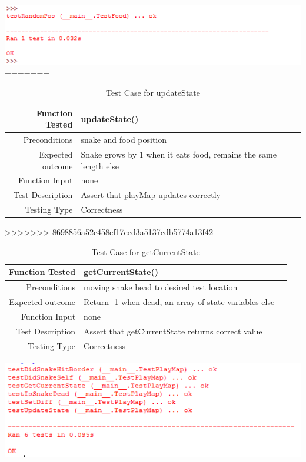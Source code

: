 \documentclass[12pt]{article}
\begin{document}
\includegraphics{testFoodResults}\newline\newline
=======
\begin{center}
	\begin{longtable}{ | r | p{4cm} | p{4cm} }
	\caption{Test Case for updateState} \\ \hline \label{TblInputVar} 
	Function Tested & updateState()\\ \hline
	Preconditions & snake and food position \\ \hline
	Expected outcome & Snake grows by 1 when it eats food, remains the same length else \\ \hline
	Function Input & none \\ \hline
	Test Description & Assert that playMap updates correctly \\ \hline
	Testing Type & Correctness\\ \hline
	
	\end{longtable}
\end{center}
>>>>>>> 8698856a52c458cf17ced3a5137cdb5774a13f42

\begin{center}
	\begin{longtable}{ | r | p{4cm} | p{4cm} }
	\caption{Test Case for getCurrentState} \\ \hline \label{TblInputVar} 
	Function Tested & getCurrentState()\\ \hline
	Preconditions & moving snake head to desired test location \\ \hline
	Expected outcome & Return -1 when dead, an array of state variables else \\ \hline
	Function Input & none \\ \hline
	Test Description & Assert that getCurrentState returns correct value\\ \hline
	Testing Type & Correctness\\ \hline
	
	\end{longtable}
\includegraphics{testPlayMapResults}\newline\newline
\end{center}
\end{document}

